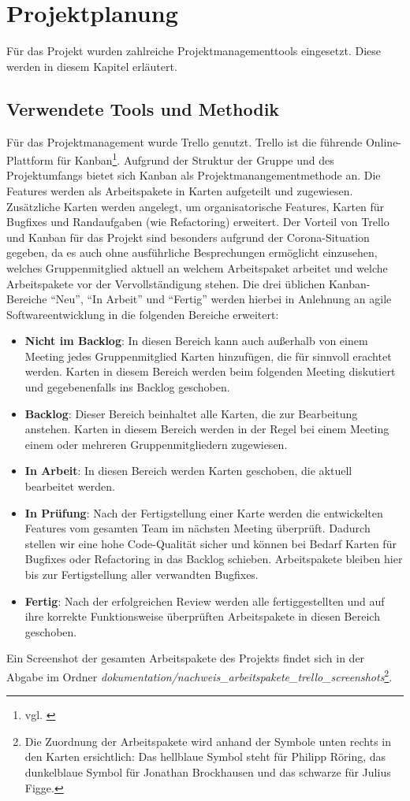 \section{Projektplanung}
Für das Projekt wurden zahlreiche Projektmanagementtools eingesetzt.
Diese werden in diesem Kapitel erläutert.

\subsection{Verwendete Tools und Methodik}
Für das Projektmanagement wurde Trello genutzt.
Trello ist die führende Online-Plattform für Kanban\footnote{vgl. \cite{atlassian}}.
Aufgrund der Struktur der Gruppe und des Projektumfangs bietet sich Kanban als Projektmanangementmethode an.
Die Features werden als Arbeitspakete in Karten aufgeteilt und zugewiesen.
Zusätzliche Karten werden angelegt, um organisatorische Features, Karten für Bugfixes und Randaufgaben (wie Refactoring) erweitert.
Der Vorteil von Trello und Kanban für das Projekt sind besonders aufgrund der Corona-Situation gegeben, da es auch ohne ausführliche Besprechungen ermöglicht einzusehen, welches Gruppenmitglied aktuell an welchem Arbeitspaket arbeitet und welche Arbeitspakete vor der Vervollständigung stehen.
Die drei üblichen Kanban-Bereiche \enquote{Neu}, \enquote{In Arbeit} und \enquote{Fertig} werden hierbei in Anlehnung an agile Softwareentwicklung in die folgenden Bereiche erweitert:
\begin{itemize}
    \item \textbf{Nicht im Backlog}: In diesen Bereich kann auch außerhalb von einem Meeting jedes Gruppenmitglied Karten hinzufügen, die für sinnvoll erachtet werden. Karten in diesem Bereich werden beim folgenden Meeting diskutiert und gegebenenfalls ins Backlog geschoben.
    \item \textbf{Backlog}: Dieser Bereich beinhaltet alle Karten, die zur Bearbeitung anstehen. Karten in diesem Bereich werden in der Regel bei einem Meeting einem oder mehreren Gruppenmitgliedern zugewiesen.
    \item \textbf{In Arbeit}: In diesen Bereich werden Karten geschoben, die aktuell bearbeitet werden.
    \item \textbf{In Prüfung}: Nach der Fertigstellung einer Karte werden die entwickelten Features vom gesamten Team im nächsten Meeting überprüft. Dadurch stellen wir eine hohe Code-Qualität sicher und können bei Bedarf Karten für Bugfixes oder Refactoring in das Backlog schieben. Arbeitspakete bleiben hier bis zur Fertigstellung aller verwandten Bugfixes.
    \item \textbf{Fertig}: Nach der erfolgreichen Review werden alle fertiggestellten und auf ihre korrekte Funktionsweise überprüften Arbeitspakete in diesen Bereich geschoben.
\end{itemize}
Ein Screenshot der gesamten Arbeitspakete des Projekts findet sich in der Abgabe im Ordner \textit{dokumentation/nachweis\_arbeitspakete\_trello\_screenshots}\footnote{Die Zuordnung der Arbeitspakete wird anhand der Symbole unten rechts in den Karten ersichtlich: Das hellblaue Symbol steht für Philipp Röring, das dunkelblaue Symbol für Jonathan Brockhausen und das schwarze für Julius Figge.}.

